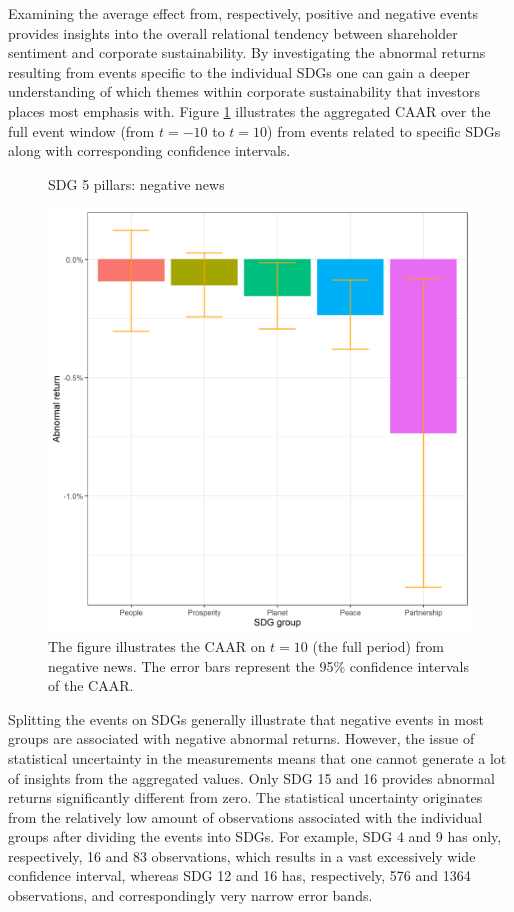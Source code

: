 Examining the average effect from, respectively, positive and negative events provides insights into the overall relational tendency between shareholder sentiment and corporate sustainability. By investigating the abnormal returns resulting from events specific to the individual SDGs one can gain a deeper understanding of which themes within corporate sustainability that investors places most emphasis with. Figure \ref{fig:ST_neg_bar} illustrates the aggregated CAAR over the full event window (from $t=-10$ to $t=10$) from events related to specific SDGs along with corresponding confidence intervals. 

\begin{figure} [H]
    \centering
    \caption{SDG 5 pillars: negative news}
    \includegraphics[scale=0.6]{Projekt/1.Figures analysis/ST_negative_sdg_bar_groups_0.png}
    \caption*{\footnotesize The figure illustrates the CAAR on $t = 10$ (the full period) from negative news. The error bars represent the 95\% confidence intervals of the CAAR.}
    \label{fig:ST_neg_bar}
\end{figure}

Splitting the events on SDGs generally illustrate that negative events in most groups are associated with negative abnormal returns. However, the issue of statistical uncertainty in the measurements means that one cannot generate a lot of insights from the aggregated values. Only SDG 15 and 16 provides abnormal returns significantly different from zero. The statistical uncertainty originates from the relatively low amount of observations associated with the individual groups after dividing the events into SDGs. For example, SDG 4 and 9 has only, respectively, 16 and 83 observations, which results in a vast excessively wide confidence interval, whereas SDG 12 and 16 has, respectively, 576 and 1364 observations, and correspondingly very narrow error bands. 

